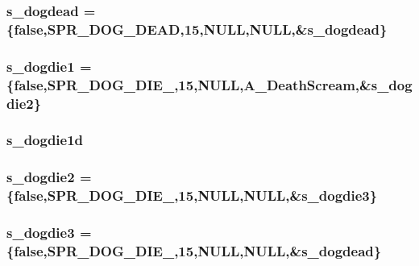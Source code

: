 \label{WL__ACT2_8C_a2c20549f02ea25ec68a58330a4ded3ce}
\hypertarget{WL__ACT2_8C_ac1b4097b612709874970b7dbcf98d237}{
\subsubsection[{s\_\-dogdead}]{ {\bf s\_\-dogdead} = \{false,SPR\_\-DOG\_\-DEAD,15,NULL,NULL,\&{\bf s\_\-dogdead}\}}}
\label{WL__ACT2_8C_ac1b4097b612709874970b7dbcf98d237}
\hypertarget{WL__ACT2_8C_a194d846647c57b650ec0478566bac165}{
\subsubsection[{s\_\-dogdie1}]{ {\bf s\_\-dogdie1} = \{false,SPR\_\-DOG\_\-DIE\_,15,NULL,A\_\-DeathScream,\&{\bf s\_\-dogdie2}\}}}
\label{WL__ACT2_8C_a194d846647c57b650ec0478566bac165}
\hypertarget{WL__ACT2_8C_a01165014bbb7e6d787a34045aa9fa32f}{
\subsubsection[{s\_\-dogdie1d}]{ {\bf s\_\-dogdie1d}}}
\label{WL__ACT2_8C_a01165014bbb7e6d787a34045aa9fa32f}
\hypertarget{WL__ACT2_8C_a09233ca3c171ae36f986db31e03e6609}{
\subsubsection[{s\_\-dogdie2}]{ {\bf s\_\-dogdie2} = \{false,SPR\_\-DOG\_\-DIE\_,15,NULL,NULL,\&{\bf s\_\-dogdie3}\}}}
\label{WL__ACT2_8C_a09233ca3c171ae36f986db31e03e6609}
\hypertarget{WL__ACT2_8C_a8fdecc366ad38c39f6150272f4f80ee7}{
\subsubsection[{s\_\-dogdie3}]{ {\bf s\_\-dogdie3} = \{false,SPR\_\-DOG\_\-DIE\_,15,NULL,NULL,\&{\bf s\_\-dogdead}\}}}
